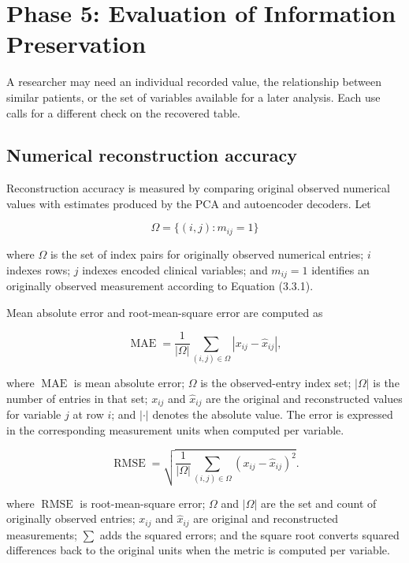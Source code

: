 \section{Phase 5: Evaluation of Information
	Preservation}\label{phase-5-evaluation-of-information-preservation}

\noindent A researcher may need an individual recorded value, the relationship between similar patients, or the set of variables available for a later analysis. Each use calls for a different check on the recovered table.

\subsection{Numerical reconstruction accuracy}\label{numerical-reconstruction-accuracy}

Reconstruction accuracy is measured by comparing original observed
numerical values with estimates produced by the PCA and autoencoder
decoders. Let

\[
\Omega=\{(i,j):m_{ij}=1\}\tag{3.8.1}
\]

\noindent where \(\Omega\) is the set of index pairs for originally observed
numerical entries; \(i\) indexes rows; \(j\) indexes encoded clinical
variables; and \(m_{ij}=1\) identifies an originally observed
measurement according to Equation (3.3.1).

\noindent Mean absolute error and root-mean-square error are computed as

\[
\operatorname{MAE}=
\frac{1}{|\Omega|}
\sum_{(i,j)\in\Omega}|x_{ij}-\hat{x}_{ij}|,\tag{3.8.2}
\]

\noindent where \(\operatorname{MAE}\) is mean absolute error; \(\Omega\) is the
observed-entry index set; \(|\Omega|\) is the number of entries in that
set; \(x_{ij}\) and \(\hat{x}_{ij}\) are the original and reconstructed
values for variable \(j\) at row \(i\); and \(|\cdot|\) denotes the
absolute value. The error is expressed in the corresponding measurement
units when computed per variable.

\[
\operatorname{RMSE}=
\sqrt{\frac{1}{|\Omega|}
	\sum_{(i,j)\in\Omega}(x_{ij}-\hat{x}_{ij})^2}.\tag{3.8.3}
\]

\noindent where \(\operatorname{RMSE}\) is root-mean-square error; \(\Omega\) and
\(|\Omega|\) are the set and count of originally observed entries;
\(x_{ij}\) and \(\hat{x}_{ij}\) are original and reconstructed
measurements; \(\sum\) adds the squared errors; and the square root
converts squared differences back to the original units when the metric
is computed per variable.

